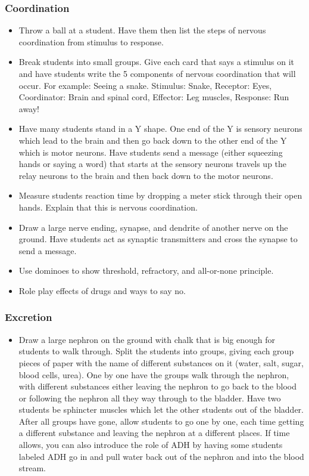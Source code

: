 \subsubsection{Coordination}
\begin{itemize}
\item	Throw a ball at a student.  Have them then list the steps of nervous coordination from stimulus to response.
\item Break students into small groups. Give each card that says a stimulus on it and have students write the 5 components of nervous coordination that will occur. For example: Seeing a snake. Stimulus: Snake, Receptor: Eyes, Coordinator: Brain and spinal cord, Effector: Leg muscles, Response: Run away! 
\item Have many students stand in a Y shape. One end of the Y is sensory neurons which lead to the brain and then go back down to the other end of the Y which is motor neurons.  Have students send a message (either squeezing hands or saying a word) that starts at the sensory neurons travels up the relay neurons to the brain and then back down to the motor neurons.
\item Measure students reaction time by dropping a meter stick through their open hands. Explain that this is nervous coordination.
\item Draw a large nerve ending, synapse, and dendrite of another nerve on the ground.  Have students act as synaptic transmitters and cross the synapse to send a message.
\item Use dominoes to show threshold, refractory, and all-or-none principle.
\item Role play effects of drugs and ways to say no.
\end{itemize}

\subsubsection{Excretion}
\begin{itemize}
\item Draw a large nephron on the ground with chalk that is big enough for students to walk through. Split the students into groups, giving each group pieces of paper with  the name of different substances on it (water, salt, sugar, blood cells, urea). One by one have the groups walk through the nephron, with different substances either leaving the nephron to go back to the blood or following the nephron all they way through to the bladder. Have two students be sphincter muscles which let the other students out of the bladder.
After all groups have gone, allow students to go one by one, each time getting a different substance and leaving the nephron at a different places. If time allows, you can also introduce the role of ADH by having some students labeled ADH go in and pull water back out of the nephron and into the blood stream. 
\end{itemize}

